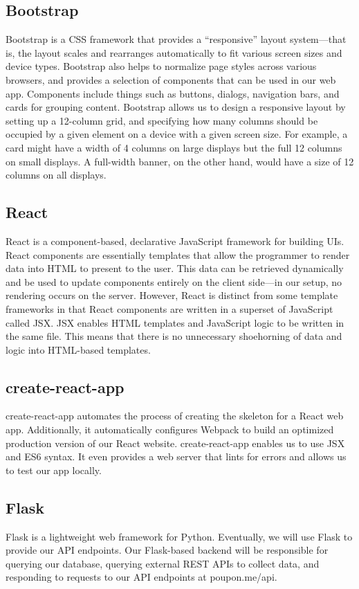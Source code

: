 \documentclass{scrartcl}
\begin{document}
\subsection{Bootstrap}
Bootstrap is a CSS framework that provides a “responsive” layout system—that is, the layout scales and rearranges automatically to fit various screen sizes and device types. Bootstrap also helps to normalize page styles across various browsers, and provides a selection of components that can be used in our web app. Components include things such as buttons, dialogs, navigation bars, and cards for grouping content. Bootstrap allows us to design a responsive layout by setting up a 12-column grid, and specifying how many columns should be occupied by a given element on a device with a given screen size. For example, a card might have a width of 4 columns on large displays but the full 12 columns on small displays. A full-width banner, on the other hand, would have a size of 12 columns on all displays.

\subsection{React}
React is a component-based, declarative JavaScript framework for building UIs. React components are essentially templates that allow the programmer to render data into HTML to present to the user. This data can be retrieved dynamically and be used to update components entirely on the client side—in our setup, no rendering occurs on the server. However, React is distinct from some template frameworks in that React components are written in a superset of JavaScript called JSX. JSX enables HTML templates and JavaScript logic to be written in the same file. This means that there is no unnecessary shoehorning of data and logic into HTML-based templates.

\subsection{create-react-app}
create-react-app automates the process of creating the skeleton for a React web app. Additionally, it automatically configures Webpack to build an optimized production version of our React website. create-react-app enables us to use JSX and ES6 syntax. It even provides a web server that lints for errors and allows us to test our app locally.

\subsection{Flask}
Flask is a lightweight web framework for Python. Eventually, we will use Flask to provide our API endpoints. Our Flask-based backend will be responsible for querying our database, querying external REST APIs to collect data, and responding to requests to our API endpoints at poupon.me/api.
\end{document}
